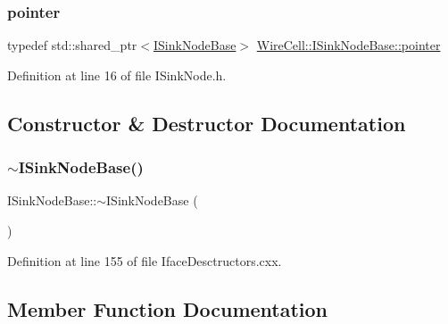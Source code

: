 \subsubsection{\texorpdfstring{pointer}{pointer}}
{\footnotesize\ttfamily typedef std\+::shared\+\_\+ptr$<$\hyperlink{class_wire_cell_1_1_i_sink_node_base}{I\+Sink\+Node\+Base}$>$ \hyperlink{class_wire_cell_1_1_i_sink_node_base_a24a5f7170b121dd9ce5a0ea31ef9614d}{Wire\+Cell\+::\+I\+Sink\+Node\+Base\+::pointer}}



Definition at line 16 of file I\+Sink\+Node.\+h.



\subsection{Constructor \& Destructor Documentation}
\mbox{\label{class_wire_cell_1_1_i_sink_node_base_a39a4ff13ba5364518da0e3be75234266}} 
\subsubsection{\texorpdfstring{$\sim$\+I\+Sink\+Node\+Base()}{~ISinkNodeBase()}}
{\footnotesize\ttfamily I\+Sink\+Node\+Base\+::$\sim$\+I\+Sink\+Node\+Base (\begin{DoxyParamCaption}{ }\end{DoxyParamCaption})\hspace{0.3cm}{\ttfamily [virtual]}}



Definition at line 155 of file Iface\+Desctructors.\+cxx.



\subsection{Member Function Documentation}
\mbox{\label{class_wire_cell_1_1_i_sink_node_base_aed8e3945184e47177abf0b16c74e6aff}} 
